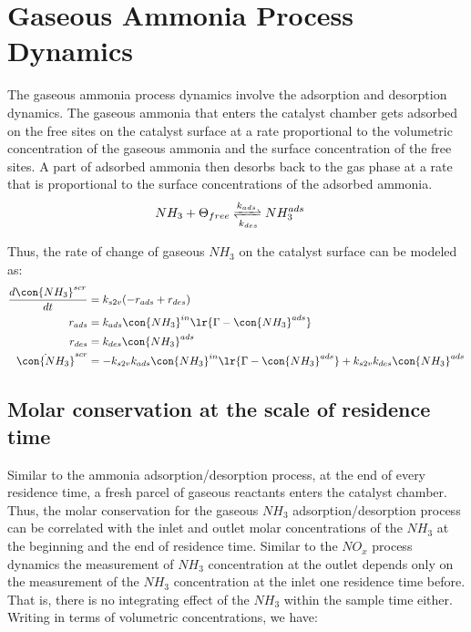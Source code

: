 \section{Gaseous Ammonia Process Dynamics}
The gaseous ammonia process dynamics involve the adsorption and desorption dynamics. The gaseous ammonia that enters the
catalyst chamber gets adsorbed on the free sites on the catalyst surface at a rate proportional to the volumetric
concentration of the gaseous ammonia and the surface concentration of the free sites. A part of adsorbed ammonia then
desorbs back to the gas phase at a rate that is proportional to the surface concentrations of the adsorbed ammonia.
\begin{align*}
    NH_3 + \Theta_{free} &\xrightleftharpoons[k_{des}]{k_{ads}} NH_3^{ads}
\end{align*}

Thus, the rate of change of gaseous $NH_3$ on the catalyst surface can be modeled as:
\begin{align*}
    \frac{d \con{NH_3}^{scr}}{dt} &= k_{s2v} (-r_{ads} + r_{des}) \\
    r_{ads} &= k_{ads} \con{NH_3}^{in} \lr{\Gamma - \con{NH_3}^{ads}}\\
    r_{des} &= k_{des} \con{NH_3}^{ads}\\
    \dot{\con{NH_3}}^{scr} &= -k_{s2v}k_{ads} \con{NH_3}^{in} \lr{\Gamma - \con{NH_3}^{ads}} + k_{s2v} k_{des} \con{NH_3}^{ads}\\
\end{align*}

\subsection{Molar conservation at the scale of residence time}

Similar to the ammonia adsorption/desorption process, at the end of every residence time, a fresh parcel of gaseous
reactants enters the catalyst chamber. Thus, the molar conservation for the gaseous $NH_3$ adsorption/desorption process
can be correlated with the inlet and outlet molar concentrations of the $NH_3$ at the beginning and the end of residence
time. Similar to the $NO_x$ process dynamics the measurement of $NH_3$ concentration at the outlet depends only on the
measurement of the $NH_3$ concentration at the inlet one residence time before. That is, there is no integrating effect
of the $NH_3$ within the sample time either. Writing in terms of volumetric concentrations, we have:

